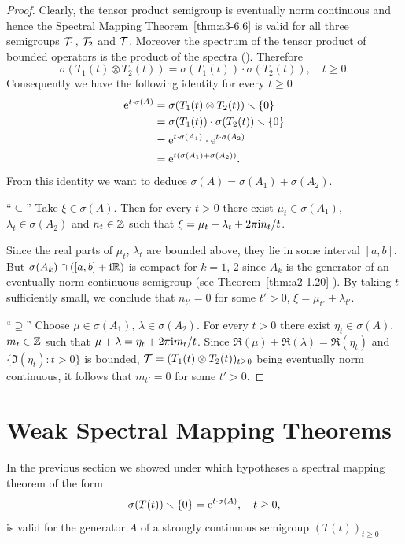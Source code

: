 \begin{proof}
Clearly, the tensor product semigroup is eventually norm continuous and hence the Spectral Mapping Theorem~\ref{thm:a3-6.6} is valid for all three semigroups $\mathcal{T}_{1}$, $\mathcal{T}_{2}$ and $\mathcal{T}$.
Moreover the spectrum of the tensor product of bounded operators is the product of the spectra 
(\textcite[XIII.9]{reedsimon:1978}).
Therefore
\[
	\sigma(T_{1}(t)\otimes T_{2}(t)) = \sigma(T_{1}(t))\cdot\sigma(T_{2}(t)), \quad t \geq 0 .
\]
Consequently we have the following identity for every $t \geq 0$ 
\begin{align*}
\mathrm{e}^{t\cdot\sigma(A)} &= \sigma(T_{1}(t)\otimes T_{2}(t)) \smallsetminus \{0\} \\
&= \sigma(T_{1}(t))\cdot\sigma(T_{2}(t)) \smallsetminus \{0\} \\
&= \mathrm{e}^{t\cdot\sigma(A_{1})}\cdot \mathrm{e}^{t\cdot\sigma(A_{2})} \\
&= \mathrm{e}^{t(\sigma(A_{1})+\sigma(A_{2}))} .
\end{align*}
From this identity we want to deduce $\sigma(A) = \sigma(A_{1}) + \sigma(A_{2})$.

\enquote{$\subseteq$}\quad 
Take $\xi \in \sigma(A)$.
Then for every $t > 0$ there exist $\mu_{t} \in \sigma(A_{1})$, $\lambda_{t} \in \sigma(A_{2})$ and $n_{t} \in \mathbb{Z}$ such that $\xi = \mu_{t} + \lambda_{t} + 2\pi\mathrm{i}  n_{t}/t$.

Since the real parts of\/ $\mu_{t}$, $\lambda_{t}$ are bounded above, they lie in some interval $[a,b]$.
But $\sigma(A_{k}) \cap ( [a,b] + \mathrm{i} \mathbb{R} )$ is compact for $k = 1$, $2$  since $A_{k}$ is the generator of an eventually norm continuous semigroup (see Theorem~\ref{thm:a2-1.20} ).
By taking $t$ sufficiently small, we conclude that $n_{t'} = 0$ for some $t' > 0$, \ie $\xi = \mu_{t'} + \lambda_{t'}$.

\enquote{$\supseteq$}\quad 
Choose $\mu \in \sigma(A_{1})$, $\lambda \in \sigma(A_{2})$.
For every $t > 0$ there exist $\eta_{t} \in \sigma(A)$, $m_{t} \in \mathbb{Z}$ such that $\mu + \lambda = \eta_{t} + 2\pi \mathrm{i} m_{t}/t$.
Since $\Re(\mu) + \Re(\lambda) = \Re(\eta_{t})$ and $\{\Im(\eta_{t}) \colon t > 0\}$ is bounded, 
$\TT = (T_{1}(t) \otimes T_{2}(t))_{t\geq 0}$ being eventually norm continuous, it follows that $m_{t'} = 0$ for some $t' > 0$.
\end{proof}
\section{Weak Spectral Mapping Theorems}\label{sec:a3-7}%
In the previous section we showed under which hypotheses a spectral mapping theorem of the form
\begin{equation}\label{eq:a3-7.1}
	\sigma(T(t)) \setminus \{0\} = \eu^{t \cdot \sigma(A)}, \quad t \geq 0 ,
\end{equation}
is valid for the generator $A$ of a strongly continuous semigroup $(T(t))_{t\geq 0}$.

